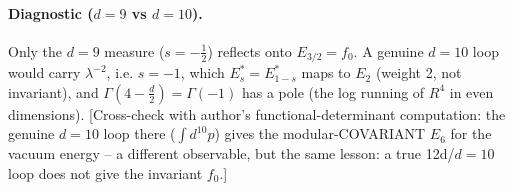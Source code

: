 \paragraph{Diagnostic ($d=9$ vs $d=10$).}
Only the $d=9$ measure ($s=-\tfrac12$) reflects onto $E_{3/2}=f_0$.
A genuine $d=10$ loop would carry $\lambda^{-2}$, i.e. $s=-1$, which $E_s^\ast=E_{1-s}^\ast$ maps to
$E_2$ (weight 2, not invariant), and $\Gamma(4-\tfrac d2)=\Gamma(-1)$ has a pole (the log running of
$R^4$ in even dimensions). [Cross-check with author's functional-determinant computation: the genuine
$d=10$ loop there ($\int d^{10}p$) gives the modular-COVARIANT $E_6$ for the vacuum energy -- a
different observable, but the same lesson: a true 12d/$d=10$ loop does not give the invariant $f_0$.]
